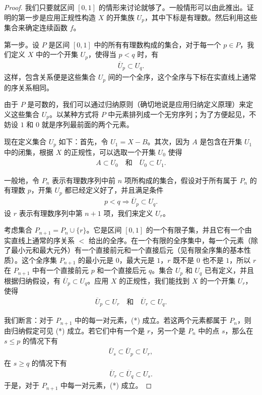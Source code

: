 \begin{proof}
我们只要就区间 $[0,1]$ 的情形来讨论就够了。一般情形可以由此推出。证明的第一步是应用正规性构造 $X$ 的开集族 $U_{p}$，其中下标是有理数。然后利用这些集合来确定连续函数 $f$。

第一步。设 $P$ 是区间 $[0,1]$ 中的所有有理数构成的集合，对于每一个 $p\in P$，我们定义 $X$ 中的一个开集 $U_{p}$，使得当 $p<q$ 时，有
\begin{align*}
\overline{U}_{p}\subset U_{q}.
\end{align*}
这样，包含关系便是这些集合 $U_{p}$ 间的一个全序，这个全序与下标在实直线上通常的序关系相同。

由于 $P$ 是可数的，我们可以通过归纳原则（确切地说是应用归纳定义原理）来定义这些集合 $U_{p}$。以某种方式将 $P$ 中元素排列成一个无穷序列；为了方便起见，不妨设 $1$ 和 $0$ 就是序列最前面的两个元素。

现在定义集合 $U_{p}$ 如下：首先，令 $U_{1}=X-B$。其次，因为 $A$ 是包含在开集 $U_{1}$ 中的闭集，根据 $X$ 的正规性，可以选取一个开集 $U_{0}$ 使得
\begin{align*}
A\subset U_{0}\quad\text{和}\quad\overline{U}_{0}\subset U_{1}.
\end{align*}

一般地，令 $P_{n}$ 表示有理数序列中前 $n$ 项所构成的集合，假设对于所有属于 $P_{n}$ 的有理数 $p$，开集 $U_{p}$ 都已经定义好了，并且满足条件
\begin{align}
p<q\Longrightarrow\overline{U}_{p}\subset U_{q}.
\end{align}
设 $r$ 表示有理数序列中第 $n+1$ 项，我们来定义 $U_{r}$。

考虑集合 $P_{n+1}=P_{n}\cup\{r\}$。它是区间 $[0,1]$ 的一个有限子集，并且它有一个由实直线上通常的序关系 $<$ 给出的全序。在一个有限的全序集中，每一个元素（除了最小元和最大元外）有一个直接前元和一个直接后元（见有限全序集的基本性质）。这个全序集 $P_{n+1}$ 的最小元是 $0$，最大元是 $1$，$r$ 既不是 $0$ 也不是 $1$，所以 $r$ 在 $P_{n+1}$ 中有一个直接前元 $p$ 和一个直接后元 $q$。集合 $U_{p}$ 和 $U_{q}$ 已有定义，并且根据归纳假设，有 $\overline{U}_{p}\subset U_{q}$。应用 $X$ 的正规性，我们能找到 $X$ 的一个开集 $U_{r}$，使得
\begin{align*}
\overline{U}_{p}\subset U_{r}\quad\text{和}\quad\overline{U}_{r}\subset U_{q}.
\end{align*}

我们断言：对于 $P_{n+1}$ 中的每一对元素，(*) 成立。若这两个元素都属于 $P_{n}$，则由归纳假定可见 (*) 成立。若它们中有一个是 $r$，另一个是 $P_{n}$ 中的点 $s$，那么在 $s\leqslant p$ 的情况下有
\begin{align*}
\overline{U}_{s}\subset\overline{U}_{p}\subset U_{r},
\end{align*}
在 $s\geqslant q$ 的情况下有
\begin{align*}
\overline{U}_{r}\subset\overline{U}_{q}\subset U_{s}.
\end{align*}
于是，对于 $P_{n+1}$ 中每一对元素，(*) 成立。


\end{proof}
